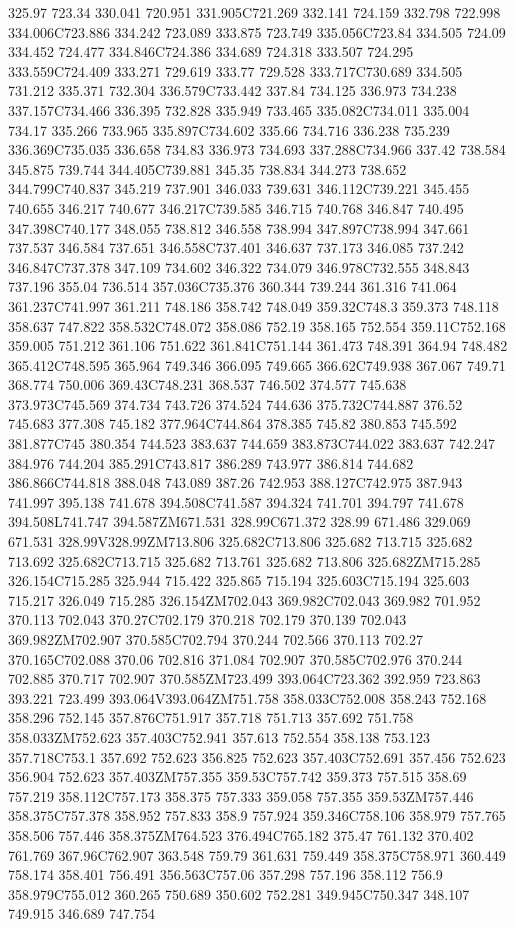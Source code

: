 325.97 723.34 330.041 720.951 331.905C721.269 332.141 724.159 332.798 722.998 334.006C723.886 334.242 723.089 333.875 723.749 335.056C723.84 334.505 724.09 334.452 724.477 334.846C724.386 334.689 724.318 333.507 724.295 333.559C724.409 333.271 729.619 333.77 729.528 333.717C730.689 334.505 731.212 335.371 732.304 336.579C733.442 337.84 734.125 336.973 734.238 337.157C734.466 336.395 732.828 335.949 733.465 335.082C734.011 335.004 734.17 335.266 733.965 335.897C734.602 335.66 734.716 336.238 735.239 336.369C735.035 336.658 734.83 336.973 734.693 337.288C734.966 337.42 738.584 345.875 739.744 344.405C739.881 345.35 738.834 344.273 738.652 344.799C740.837 345.219 737.901 346.033 739.631 346.112C739.221 345.455 740.655 346.217 740.677 346.217C739.585 346.715 740.768 346.847 740.495 347.398C740.177 348.055 738.812 346.558 738.994 347.897C738.994 347.661 737.537 346.584 737.651 346.558C737.401 346.637 737.173 346.085 737.242 346.847C737.378 347.109 734.602 346.322 734.079 346.978C732.555 348.843 737.196 355.04 736.514 357.036C735.376 360.344 739.244 361.316 741.064 361.237C741.997 361.211 748.186 358.742 748.049 359.32C748.3 359.373 748.118 358.637 747.822 358.532C748.072 358.086 752.19 358.165 752.554 359.11C752.168 359.005 751.212 361.106 751.622 361.841C751.144 361.473 748.391 364.94 748.482 365.412C748.595 365.964 749.346 366.095 749.665 366.62C749.938 367.067 749.71 368.774 750.006 369.43C748.231 368.537 746.502 374.577 745.638 373.973C745.569 374.734 743.726 374.524 744.636 375.732C744.887 376.52 745.683 377.308 745.182 377.964C744.864 378.385 745.82 380.853 745.592 381.877C745 380.354 744.523 383.637 744.659 383.873C744.022 383.637 742.247 384.976 744.204 385.291C743.817 386.289 743.977 386.814 744.682 386.866C744.818 388.048 743.089 387.26 742.953 388.127C742.975 387.943 741.997 395.138 741.678 394.508C741.587 394.324 741.701 394.797 741.678 394.508L741.747 394.587ZM671.531 328.99C671.372 328.99 671.486 329.069 671.531 328.99V328.99ZM713.806 325.682C713.806 325.682 713.715 325.682 713.692 325.682C713.715 325.682 713.761 325.682 713.806 325.682ZM715.285 326.154C715.285 325.944 715.422 325.865 715.194 325.603C715.194 325.603 715.217 326.049 715.285 326.154ZM702.043 369.982C702.043 369.982 701.952 370.113 702.043 370.27C702.179 370.218 702.179 370.139 702.043 369.982ZM702.907 370.585C702.794 370.244 702.566 370.113 702.27 370.165C702.088 370.06 702.816 371.084 702.907 370.585C702.976 370.244 702.885 370.717 702.907 370.585ZM723.499 393.064C723.362 392.959 723.863 393.221 723.499 393.064V393.064ZM751.758 358.033C752.008 358.243 752.168 358.296 752.145 357.876C751.917 357.718 751.713 357.692 751.758 358.033ZM752.623 357.403C752.941 357.613 752.554 358.138 753.123 357.718C753.1 357.692 752.623 356.825 752.623 357.403C752.691 357.456 752.623 356.904 752.623 357.403ZM757.355 359.53C757.742 359.373 757.515 358.69 757.219 358.112C757.173 358.375 757.333 359.058 757.355 359.53ZM757.446 358.375C757.378 358.952 757.833 358.9 757.924 359.346C758.106 358.979 757.765 358.506 757.446 358.375ZM764.523 376.494C765.182 375.47 761.132 370.402 761.769 367.96C762.907 363.548 759.79 361.631 759.449 358.375C758.971 360.449 758.174 358.401 756.491 356.563C757.06 357.298 757.196 358.112 756.9 358.979C755.012 360.265 750.689 350.602 752.281 349.945C750.347 348.107 749.915 346.689 747.754 